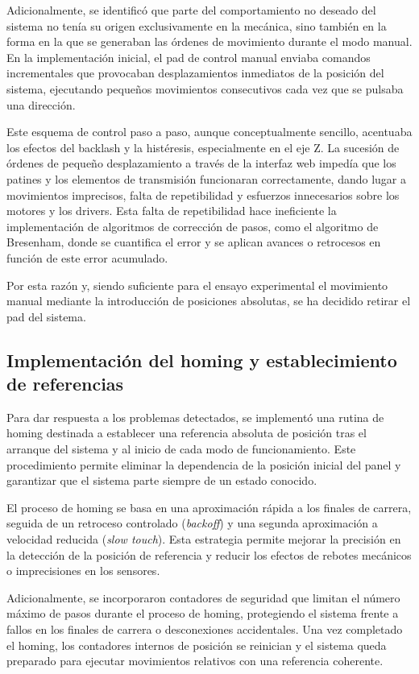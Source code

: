 Adicionalmente, se identificó que parte del comportamiento no deseado del sistema no tenía su origen exclusivamente en la mecánica, sino también en la forma en la que se generaban las órdenes de movimiento durante el modo manual. En la implementación inicial, el pad de control manual enviaba comandos incrementales que provocaban desplazamientos inmediatos de la posición del sistema, ejecutando pequeños movimientos consecutivos cada vez que se pulsaba una dirección.

Este esquema de control paso a paso, aunque conceptualmente sencillo, acentuaba los efectos del backlash y la histéresis, especialmente en el eje Z. La sucesión de órdenes de pequeño desplazamiento a través de la interfaz web impedía que los patines y los elementos de transmisión funcionaran correctamente, dando lugar a movimientos imprecisos, falta de repetibilidad y esfuerzos innecesarios sobre los motores y los drivers. Esta falta de repetibilidad hace ineficiente la implementación de algoritmos de corrección de pasos, como el algoritmo de Bresenham, donde se cuantifica el error y se aplican avances o retrocesos en función de este error acumulado.

Por esta razón y, siendo suficiente para el ensayo experimental el movimiento manual mediante la introducción de posiciones absolutas, se ha decidido retirar el pad del sistema.

\subsection{Implementación del homing y establecimiento de referencias}

Para dar respuesta a los problemas detectados, se implementó una rutina de homing destinada a establecer una referencia absoluta de posición tras el arranque del sistema y al inicio de cada modo de funcionamiento. Este procedimiento permite eliminar la dependencia de la posición inicial del panel y garantizar que el sistema parte siempre de un estado conocido.

El proceso de homing se basa en una aproximación rápida a los finales de carrera, seguida de un retroceso controlado (\textit{backoff}) y una segunda aproximación a velocidad reducida (\textit{slow touch}). Esta estrategia permite mejorar la precisión en la detección de la posición de referencia y reducir los efectos de rebotes mecánicos o imprecisiones en los sensores.

Adicionalmente, se incorporaron contadores de seguridad que limitan el número máximo de pasos durante el proceso de homing, protegiendo el sistema frente a fallos en los finales de carrera o desconexiones accidentales. Una vez completado el homing, los contadores internos de posición se reinician y el sistema queda preparado para ejecutar movimientos relativos con una referencia coherente.

